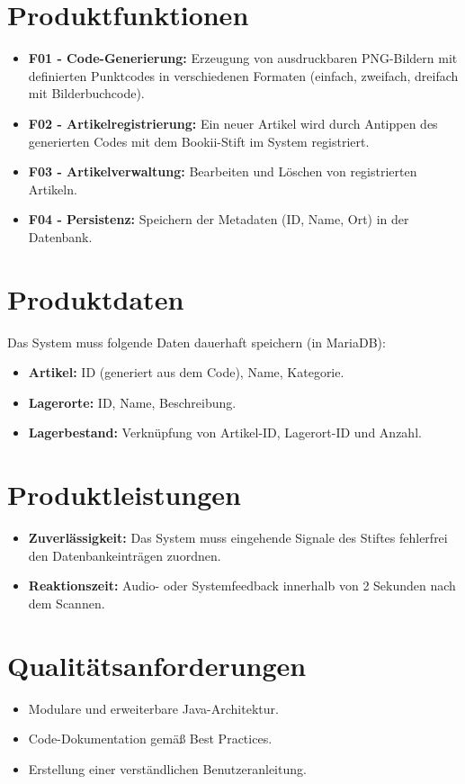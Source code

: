 \documentclass[12pt, a4paper]{article}
\begin{document}
\section{Produktfunktionen}
\begin{itemize}
    \item \textbf{F01 - Code-Generierung:} Erzeugung von ausdruckbaren PNG-Bildern mit definierten Punktcodes in verschiedenen Formaten (einfach, zweifach, dreifach mit Bilderbuchcode).
    \item \textbf{F02 - Artikelregistrierung:} Ein neuer Artikel wird durch Antippen des generierten Codes mit dem Bookii-Stift im System registriert.
    \item \textbf{F03 - Artikelverwaltung:} Bearbeiten und Löschen von registrierten Artikeln.
    \item \textbf{F04 - Persistenz:} Speichern der Metadaten (ID, Name, Ort) in der Datenbank.
\end{itemize}

\section{Produktdaten}
Das System muss folgende Daten dauerhaft speichern (in MariaDB):
\begin{itemize}
    \item \textbf{Artikel:} ID (generiert aus dem Code), Name, Kategorie.
    \item \textbf{Lagerorte:} ID, Name, Beschreibung.
    \item \textbf{Lagerbestand:} Verknüpfung von Artikel-ID, Lagerort-ID und Anzahl.
\end{itemize}

\section{Produktleistungen}
\begin{itemize}
    \item \textbf{Zuverlässigkeit:} Das System muss eingehende Signale des Stiftes fehlerfrei den Datenbankeinträgen zuordnen.
    \item \textbf{Reaktionszeit:} Audio- oder Systemfeedback innerhalb von 2 Sekunden nach dem Scannen.
\end{itemize}

\section{Qualitätsanforderungen}
\begin{itemize}
    \item Modulare und erweiterbare Java-Architektur.
    \item Code-Dokumentation gemäß Best Practices.
    \item Erstellung einer verständlichen Benutzeranleitung.
\end{itemize}
\end{document}

